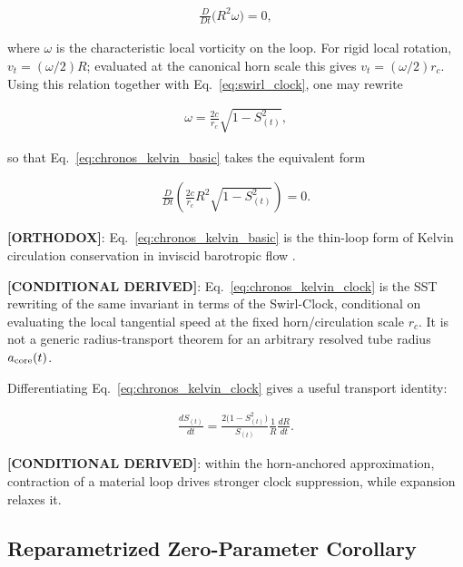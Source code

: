 \documentclass[11pt]{article}
\theoremstyle{definition}
\theoremstyle{plain}
\theoremstyle{remark}
\newcommand{\rc}{{r_c}}
\begin{document}
        \begin{align}
            \frac{D}{Dt}\!\bigl(R^2 \omega\bigr) = 0,
            \label{eq:chronos_kelvin_basic}
        \end{align}

        where $\omega$ is the characteristic local vorticity on the loop. For rigid local rotation, $v_t=(\omega/2)R$; evaluated at the canonical horn scale this gives $v_t=(\omega/2)\rc$. Using this relation together with Eq.~\eqref{eq:swirl_clock}, one may rewrite

        \begin{align}
            \omega = \frac{2c}{\rc}\sqrt{1-S_{(t)}^2},
        \end{align}

        so that Eq.~\eqref{eq:chronos_kelvin_basic} takes the equivalent form

        \begin{align}
            \frac{D}{Dt}\left(\frac{2c}{\rc} R^2 \sqrt{1-S_{(t)}^2}\right) = 0.
            \label{eq:chronos_kelvin_clock}
        \end{align}

        \textbf{[ORTHODOX]}: Eq.~\eqref{eq:chronos_kelvin_basic} is the thin-loop form of Kelvin circulation conservation in inviscid barotropic flow \cite{Batchelor1967,Saffman1992}.

        \textbf{[CONDITIONAL DERIVED]}: Eq.~\eqref{eq:chronos_kelvin_clock} is the SST rewriting of the same invariant in terms of the Swirl-Clock, conditional on evaluating the local tangential speed at the fixed horn/circulation scale $\rc$. It is not a generic radius-transport theorem for an arbitrary resolved tube radius $a_{\rm core}(t)$.

        Differentiating Eq.~\eqref{eq:chronos_kelvin_clock} gives a useful transport identity:

        \begin{align}
            \frac{dS_{(t)}}{dt}
            =
            \frac{2\bigl(1-S_{(t)}^2\bigr)}{S_{(t)}}
            \frac{1}{R}\frac{dR}{dt}.
            \label{eq:clock_radius_transport}
        \end{align}

        \textbf{[CONDITIONAL DERIVED]}: within the horn-anchored approximation, contraction of a material loop drives stronger clock suppression, while expansion relaxes it.

    \subsection{Reparametrized Zero-Parameter Corollary}
        \label{subsec:zero_parameter_corollary}
\end{document}
